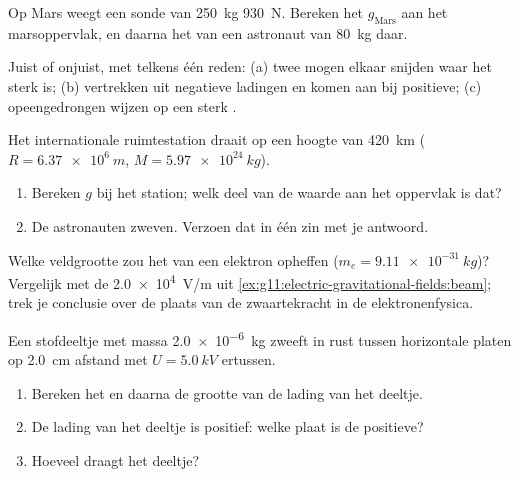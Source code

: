 \begin{exercise}[$\star$]\label{exo:g11:electric-gravitational-fields:4}
Op Mars weegt een sonde van \qty{250}{kg} \qty{930}{N}. Bereken het 
$g_{\text{Mars}}$ aan het marsoppervlak, en daarna het  van een
astronaut van \qty{80}{kg} daar.
\end{exercise}

\begin{exercise}[$\star$]\label{exo:g11:electric-gravitational-fields:5}
Juist of onjuist, met telkens één reden: (a) twee  mogen elkaar
snijden waar het  sterk is; (b)  vertrekken uit negatieve
ladingen en komen aan bij positieve; (c) opeengedrongen  wijzen
op een sterk .
\end{exercise}

\begin{exercise}[$\star\star$]\label{exo:g11:electric-gravitational-fields:6}
Het internationale ruimtestation draait op een hoogte van \qty{420}{km}
($R = \qty{6.37e6}{m}$, $M = \qty{5.97e24}{kg}$).
\begin{enumerate}
  \item Bereken $g$ bij het station; welk deel van de waarde aan het
        oppervlak is dat?
  \item De astronauten zweven. Verzoen dat in één zin met je antwoord.
\end{enumerate}
\end{exercise}

\begin{exercise}[$\star\star$]\label{exo:g11:electric-gravitational-fields:7}
Welke veldgrootte zou het  van een elektron opheffen
($m_e = \qty{9.11e-31}{kg}$)? Vergelijk met de \qty{2.0e4}{V/m} uit
\cref{ex:g11:electric-gravitational-fields:beam}; trek je conclusie over
de plaats van de zwaartekracht in de elektronenfysica.
\end{exercise}

\begin{exercise}[$\star\star$]\label{exo:g11:electric-gravitational-fields:8}
Een stofdeeltje met massa \qty{2.0e-6}{kg} zweeft in rust tussen
horizontale platen op \qty{2.0}{cm} afstand met $U = \qty{5.0}{kV}$
ertussen.
\begin{enumerate}
  \item Bereken het  en daarna de grootte van de lading van het
        deeltje.
  \item De lading van het deeltje is positief: welke plaat is de
        positieve?
  \item Hoeveel  draagt het deeltje?
\end{enumerate}
\end{exercise}

